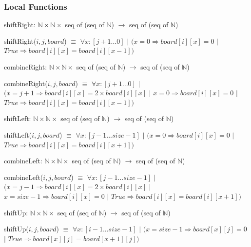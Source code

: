 \documentclass[12pt]{article}
\begin{document}
\subsubsection* {Local Functions}

shiftRight: $\mathbb{N} \times \mathbb{N} \times$ seq of (seq of $\mathbb{N}$) $\rightarrow$ seq of (seq of $\mathbb{N}$) 

\medskip

\noindent shiftRight($i, j, board$) $\equiv$ $\forall x : [j+1...0]$ $|$ $(x = 0 \Rightarrow board[i][x] = 0$ $|$ $True \Rightarrow board[i][x] = board[i][x-1])$

\bigskip
\bigskip

\noindent combineRight: $\mathbb{N} \times \mathbb{N} \times$ seq of (seq of $\mathbb{N}$) $\rightarrow$ seq of (seq of $\mathbb{N}$)

\medskip

\noindent combineRight($i, j, board$) $\equiv$ $\forall x : [j+1...0]$ $|$ $(x = j+1 \Rightarrow board[i][x] = 2 \times board[i][x]$ $|$ $x = 0 \Rightarrow board[i][x] = 0$ $|$ $True \Rightarrow board[i][x] = board[i][x-1])$

\bigskip
\bigskip

\noindent shiftLeft: $\mathbb{N} \times \mathbb{N} \times$ seq of (seq of $\mathbb{N}$) $\rightarrow$ seq of (seq of $\mathbb{N}$) 

\medskip

\noindent shiftLeft($i, j, board$) $\equiv$ $\forall x : [j-1...size-1]$ $|$ $(x = 0 \Rightarrow board[i][x] = 0$ $|$ $True \Rightarrow board[i][x] = board[i][x+1])$

\bigskip
\bigskip

\noindent combineLeft: $\mathbb{N} \times \mathbb{N} \times$ seq of (seq of $\mathbb{N}$) $\rightarrow$ seq of (seq of $\mathbb{N}$)

\medskip

\noindent combineLeft($i, j, board$) $\equiv$ $\forall x : [j-1...size-1]$ $|$ $(x = j-1 \Rightarrow board[i][x] = 2 \times board[i][x]$ $|$ $x = size-1 \Rightarrow board[i][x] = 0$ $|$ $True \Rightarrow board[i][x] = board[i][x+1])$

\bigskip
\bigskip

\noindent shiftUp: $\mathbb{N} \times \mathbb{N} \times$ seq of (seq of $\mathbb{N}$) $\rightarrow$ seq of (seq of $\mathbb{N}$) 

\medskip

\noindent shiftUp($i, j, board$) $\equiv$ $\forall x : [i-1...size-1]$ $|$ $(x = size-1 \Rightarrow board[x][j] = 0$ $|$ $True \Rightarrow board[x][j] = board[x+1][j])$
\end{document}
